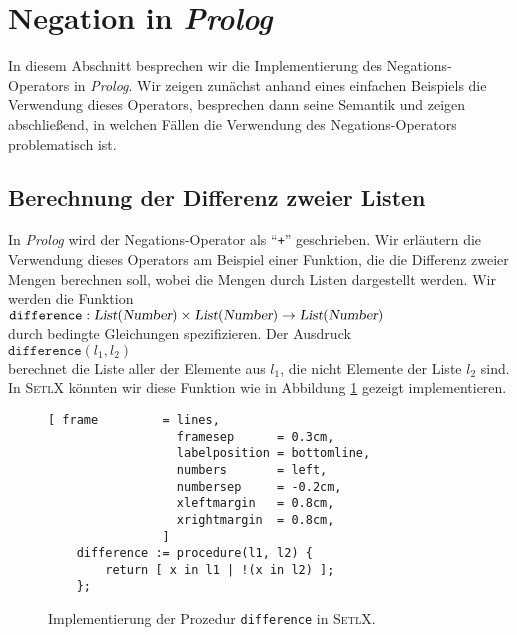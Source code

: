 \section{Negation in \textsl{Prolog}}
In diesem Abschnitt besprechen wir die Implementierung des Negations-Operators in
\textsl{Prolog}.  Wir zeigen zunächst anhand eines einfachen Beispiels die Verwendung
dieses Operators, besprechen dann seine Semantik und zeigen abschließend, in welchen
Fällen die Verwendung des Negations-Operators problematisch ist.

\subsection{Berechnung der Differenz zweier Listen}
In \textsl{Prolog} wird der Negations-Operator als ``\texttt{+}'' geschrieben.
Wir erläutern die Verwendung dieses 
Operators am Beispiel einer Funktion, die die Differenz zweier Mengen berechnen soll,
wobei die Mengen durch Listen dargestellt werden.  Wir werden  die Funktion \\[0.1cm]
\hspace*{1.3cm} 
$\texttt{difference}: \textsl{List}(\textsl{Number}) \times \textsl{List}(\textsl{Number}) \rightarrow \textsl{List}(\textsl{Number})$
\\[0.1cm]
durch bedingte Gleichungen spezifizieren.  Der Ausdruck \\[0.1cm]
\hspace*{1.3cm} $\mathtt{difference}(l_1,l_2)$ \\[0.1cm]
berechnet die Liste aller der Elemente aus $l_1$, die nicht Elemente der Liste $l_2$ sind.
In \textsc{SetlX} könnten wir diese Funktion wie in Abbildung \ref{fig:difference.stl}
gezeigt implementieren.
\begin{figure}[!ht]
\centering
\begin{Verbatim}[ frame         = lines, 
                  framesep      = 0.3cm, 
                  labelposition = bottomline,
                  numbers       = left,
                  numbersep     = -0.2cm,
                  xleftmargin   = 0.8cm,
                  xrightmargin  = 0.8cm,
                ]
    difference := procedure(l1, l2) {
        return [ x in l1 | !(x in l2) ];
    };
\end{Verbatim}
\vspace*{-0.3cm}
\caption{Implementierung der Prozedur \texttt{difference} in \textsc{SetlX}.}
\label{fig:difference.stl}
\end{figure}

